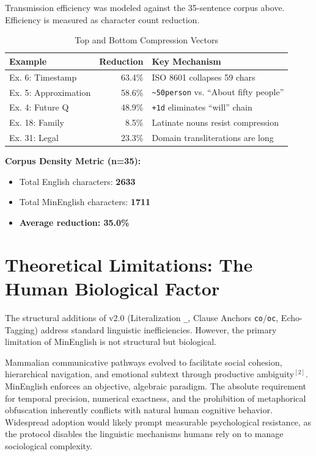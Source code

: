 \documentclass[10pt,twocolumn,letterpaper]{article}
\newcommand{\me}[1]{\texttt{#1}}
\begin{document}
Transmission efficiency was modeled against the 35-sentence corpus above. Efficiency is measured as character count reduction.

\begin{table}[h!]
\centering\small
\begin{tabularx}{\linewidth}{lrX}
\toprule
\textbf{Example} & \textbf{Reduction} & \textbf{Key Mechanism} \\
\midrule
Ex. 6: Timestamp    & 63.4\% & ISO 8601 collapses 59 chars \\
Ex. 5: Approximation & 58.6\% & \me{\~{}50person} vs. ``About fifty people'' \\
Ex. 4: Future Q     & 48.9\% & \me{+1d} eliminates ``will'' chain \\
\midrule
Ex. 18: Family      & 8.5\%  & Latinate nouns resist compression \\
Ex. 31: Legal       & 23.3\% & Domain transliterations are long \\
\bottomrule
\end{tabularx}
\caption{Top and Bottom Compression Vectors}
\end{table}

\textbf{Corpus Density Metric (n=35):}
\begin{itemize}[leftmargin=*]
    \item Total English characters: \textbf{2633}
    \item Total MinEnglish characters: \textbf{1711}
    \item \textbf{Average reduction: 35.0\%}
\end{itemize}

\section{Theoretical Limitations: The Human Biological Factor}

The structural additions of v2.0 (Literalization \me{\_}, Clause Anchors \me{co}/\me{oc}, Echo-Tagging) address standard linguistic inefficiencies. However, the primary limitation of MinEnglish is not structural but biological.

Mammalian communicative pathways evolved to facilitate social cohesion, hierarchical navigation, and emotional subtext through productive ambiguity$^{[2]}$. MinEnglish enforces an objective, algebraic paradigm. The absolute requirement for temporal precision, numerical exactness, and the prohibition of metaphorical obfuscation inherently conflicts with natural human cognitive behavior. Widespread adoption would likely prompt measurable psychological resistance, as the protocol disables the linguistic mechanisms humans rely on to manage sociological complexity.
\end{document}
